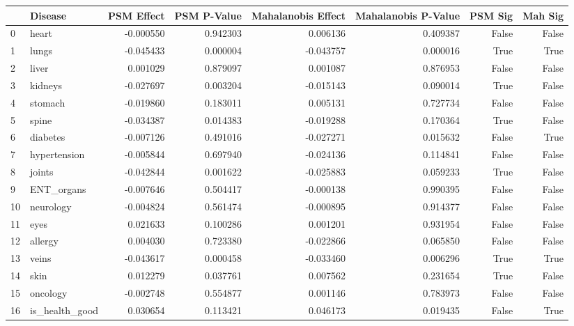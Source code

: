 \begin{tabular}{llrrrrrr}
\toprule
 & Disease & PSM Effect & PSM P-Value & Mahalanobis Effect & Mahalanobis P-Value & PSM Sig & Mah Sig \\
\midrule
0 & heart & -0.000550 & 0.942303 & 0.006136 & 0.409387 & False & False \\
1 & lungs & -0.045433 & 0.000004 & -0.043757 & 0.000016 & True & True \\
2 & liver & 0.001029 & 0.879097 & 0.001087 & 0.876953 & False & False \\
3 & kidneys & -0.027697 & 0.003204 & -0.015143 & 0.090014 & True & False \\
4 & stomach & -0.019860 & 0.183011 & 0.005131 & 0.727734 & False & False \\
5 & spine & -0.034387 & 0.014383 & -0.019288 & 0.170364 & True & False \\
6 & diabetes & -0.007126 & 0.491016 & -0.027271 & 0.015632 & False & True \\
7 & hypertension & -0.005844 & 0.697940 & -0.024136 & 0.114841 & False & False \\
8 & joints & -0.042844 & 0.001622 & -0.025883 & 0.059233 & True & False \\
9 & ENT_organs & -0.007646 & 0.504417 & -0.000138 & 0.990395 & False & False \\
10 & neurology & -0.004824 & 0.561474 & -0.000895 & 0.914377 & False & False \\
11 & eyes & 0.021633 & 0.100286 & 0.001201 & 0.931954 & False & False \\
12 & allergy & 0.004030 & 0.723380 & -0.022866 & 0.065850 & False & False \\
13 & veins & -0.043617 & 0.000458 & -0.033460 & 0.006296 & True & True \\
14 & skin & 0.012279 & 0.037761 & 0.007562 & 0.231654 & True & False \\
15 & oncology & -0.002748 & 0.554877 & 0.001146 & 0.783973 & False & False \\
16 & is_health_good & 0.030654 & 0.113421 & 0.046173 & 0.019435 & False & True \\
\bottomrule
\end{tabular}
